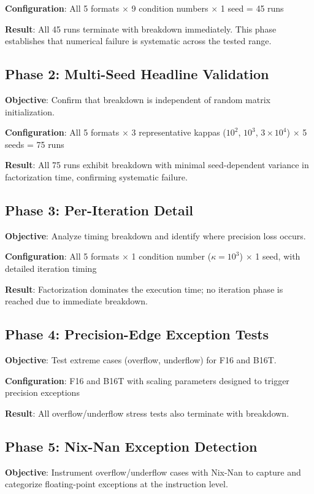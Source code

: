 \documentclass[11pt,a4paper]{article}
\begin{document}
\textbf{Configuration}: All 5 formats $\times$ 9 condition numbers $\times$ 1 seed = 45 runs

\textbf{Result}: All 45 runs terminate with breakdown immediately. This phase establishes that numerical failure is systematic across the tested range.

\subsection{Phase 2: Multi-Seed Headline Validation}
\textbf{Objective}: Confirm that breakdown is independent of random matrix initialization.

\textbf{Configuration}: All 5 formats $\times$ 3 representative kappas ($10^2$, $10^3$, $3 \times 10^4$) $\times$ 5 seeds = 75 runs

\textbf{Result}: All 75 runs exhibit breakdown with minimal seed-dependent variance in factorization time, confirming systematic failure.

\subsection{Phase 3: Per-Iteration Detail}
\textbf{Objective}: Analyze timing breakdown and identify where precision loss occurs.

\textbf{Configuration}: All 5 formats $\times$ 1 condition number ($\kappa = 10^3$) $\times$ 1 seed, with detailed iteration timing

\textbf{Result}: Factorization dominates the execution time; no iteration phase is reached due to immediate breakdown.

\subsection{Phase 4: Precision-Edge Exception Tests}
\textbf{Objective}: Test extreme cases (overflow, underflow) for F16 and B16T.

\textbf{Configuration}: F16 and B16T with scaling parameters designed to trigger precision exceptions

\textbf{Result}: All overflow/underflow stress tests also terminate with breakdown.

\subsection{Phase 5: Nix-Nan Exception Detection}
\textbf{Objective}: Instrument overflow/underflow cases with Nix-Nan to capture and categorize floating-point exceptions at the instruction level.
\end{document}
